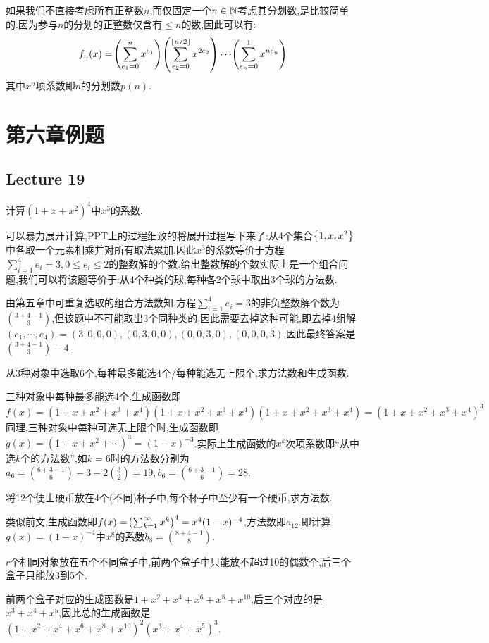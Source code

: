 \documentclass[11pt]{article}
\begin{document}
如果我们不直接考虑所有正整数$n$,而仅固定一个$n\in \mathbb{N}$考虑其分划数,是比较简单的.因为参与$n$的分划的正整数仅含有$\leq n$的数,因此可以有:
$$f_n(x)=\!\left(\sum_{e_1=0}^{n}x^{e_1}\right)\!\left(\sum_{e_2=0}^{\left\lfloor n/2\right\rfloor} x^{2e_2}\right)\cdots \!\left(\sum_{e_n=0}^1 x^{ne_n}\right)$$
其中$x^n$项系数即$n$的分划数$p(n)$.

\section{第六章例题}
\subsection{Lecture 19}
\begin{example}
    计算$(1+x+x^2)^4$中$x^3$的系数.
\end{example}

可以暴力展开计算,PPT上的过程细致的将展开过程写下来了:从4个集合$\left\{1,x,x^2\right\}$中各取一个元素相乘并对所有取法累加,因此$x^3$的系数等价于方程$\sum_{i=1}^4 e_i=3, 0\leq e_i\leq 2$的整数解的个数.给出整数解的个数实际上是一个组合问题,我们可以将该题等价于:从4个种类的球,每种各2个球中取出3个球的方法数.

由第五章中可重复选取的组合方法数知,方程$\sum_{i=1}^4 e_i=3$的非负整数解个数为$\binom{3+4-1}{3}$,但该题中不可能取出3个同种类的,因此需要去掉这种可能,即去掉4组解$(e_1,\cdots,e_4)=(3,0,0,0),(0,3,0,0),(0,0,3,0),(0,0,0,3)$,因此最终答案是$\binom{3+4-1}{3}-4$.

\begin{example}
    从3种对象中选取6个,每种最多能选4个/每种能选无上限个,求方法数和生成函数.
\end{example}

三种对象中每种最多能选4个,生成函数即
$$f(x)=(1+x+x^2+x^3+x^4)(1+x+x^2+x^3+x^4)(1+x+x^2+x^3+x^4)=(1+x+x^2+x^3+x^4)^3$$
同理,三种对象中每种可选无上限个时,生成函数即$g(x)=(1+x+x^2+\cdots)^3=(1-x)^{-3}$.实际上生成函数的$x^k$次项系数即``从中选$k$个的方法数'',如$k=6$时的方法数分别为
$a_6=\binom{6+3-1}{6}-3-2\binom{3}{2}=19, b_6=\binom{6+3-1}{6}=28$.

\begin{example}
    将12个便士硬币放在4个(不同)杯子中,每个杯子中至少有一个硬币,求方法数.
\end{example}
类似前文,生成函数即$f(x)=\!\left(\sum_{k=1}^{\infty}x^k\right)^4=x^4(1-x)^{-4}$,方法数即$a_{12}$.即计算$g(x)=(1-x)^{-4}$中$x^8$的系数$b_8=\binom{8+4-1}{8}$.

\begin{example}
    $r$个相同对象放在五个不同盒子中,前两个盒子中只能放不超过10的偶数个,后三个盒子只能放3到5个.
\end{example}
前两个盒子对应的生成函数是$1+x^2+x^4+x^6+x^8+x^10$,后三个对应的是$x^3+x^4+x^5$,因此总的生成函数是$(1+x^2+x^4+x^6+x^8+x^10)^2(x^3+x^4+x^5)^3$.
\end{document}
